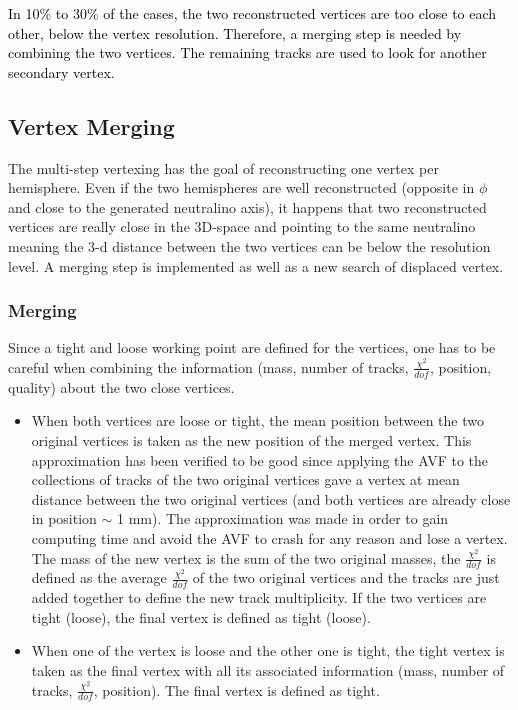 \documentclass{cernatlasnote}
\begin{document}
\textcolor{black}{In 10\% to 30\% of the cases, the two reconstructed vertices are too close to each other, below the vertex resolution. Therefore, a merging step is needed by combining the two vertices. The remaining tracks are used to look for another secondary vertex.}\\

\subsection{Vertex Merging}
The multi-step vertexing has the goal of reconstructing one vertex per hemisphere. Even if the two hemispheres are well reconstructed (opposite in $\phi$ and close to the generated neutralino axis), it happens that two reconstructed vertices are really close in the 3D-space and pointing to the same neutralino meaning the 3-d distance between the two vertices can be below the resolution level. A merging step is implemented as well as a new search of displaced vertex.

\subsubsection{Merging}
Since a tight and loose working point are defined for the vertices, one has to be careful when combining the information (mass, number of tracks, $\frac{\chi^2}{dof}$, position, quality) about the two close vertices.
\begin{itemize}
\item When both vertices are loose or tight, the mean position between the two original vertices is taken as the new position of the merged vertex. This approximation has been verified to be good since applying the AVF to the collections of tracks of the two original vertices gave a vertex at mean distance between the two original vertices (and both vertices are already close in position $\sim$ 1 mm). The approximation was made in order to gain computing time and avoid the AVF to crash for any reason and lose a vertex. The mass of the new vertex is the sum of the two original masses, the $\frac{\chi^2}{dof}$ is defined as the average $\frac{\chi^2}{dof}$ of the two original vertices and the tracks are just added together to define the new track multiplicity. If the two vertices are tight (loose), the final vertex is defined as tight (loose).
                
\item When one of the vertex is loose and the other one is tight, the tight vertex is taken as the final vertex with all its associated information  (mass, number of tracks, $\frac{\chi^2}{dof}$, position). The final vertex is defined as tight.
\end{itemize}
        
\end{document}
